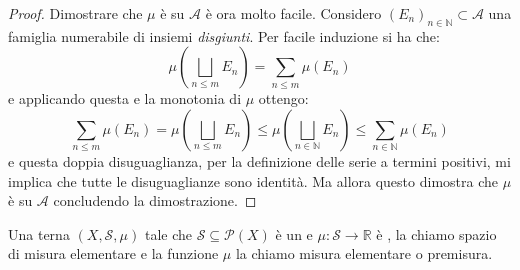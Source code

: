 \begin{proof}
	Dimostrare che $\mu$ è \sigadd{} su $\mathcal A$ è ora molto facile.
	Considero $(E_n)_{n\in\mathbb N}\subset \mathcal A$ una famiglia numerabile di insiemi \emph{disgiunti}. Per facile induzione si ha che:
	\begin{equation*}
		\mu\left(\bigsqcup_{n\le m}E_n\right)=\sum_{n\le m} \mu(E_n)
	\end{equation*}
	e applicando questa e la monotonia di $\mu$ ottengo:
	\begin{equation*}
		\sum_{n\le m} \mu(E_n)=\mu\left(\bigsqcup_{n\le m}E_n\right)\le
		\mu\left(\bigsqcup_{n\in\mathbb N}E_n\right)\le \sum_{n\in\mathbb N} \mu(E_n)
	\end{equation*}
	e questa doppia disuguaglianza, per la definizione delle serie a termini positivi, mi implica che tutte le disuguaglianze sono identità. Ma allora questo dimostra che $\mu$ è \sigadd{} su $\mathcal A$ concludendo la dimostrazione.
\end{proof}

\begin{definition}
	Una terna $(X,\mathcal S,\mu)$ tale che $\mathcal S\subseteq\mathcal P(X)$ è un \semiring{} e $\mu:\mathcal S\to \mathbb R$ è \sigadd{}, la chiamo spazio di misura elementare e la funzione $\mu$ la chiamo misura elementare o premisura.
\end{definition}






